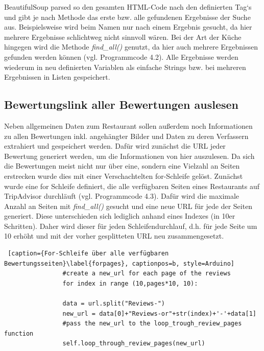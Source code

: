\documentclass[a4paper,oneside,12pt]{report}
\begin{document}
				BeautifulSoup parsed so den gesamten HTML-Code nach den definierten Tag‘s und gibt je nach Methode das erste bzw. alle gefundenen Ergebnisse der Suche aus. Beispielsweise wird beim Namen nur nach einem Ergebnis gesucht, da hier mehrere Ergebnisse schlichtweg nicht sinnvoll wären. Bei der Art der Küche hingegen wird die Methode \textit{find\_all()} genutzt, da hier auch mehrere Ergebnissen gefunden werden können (vgl. Programmcode 4.2). Alle Ergebnisse werden wiederum in neu definierten Variablen als einfache Strings bzw. bei mehreren Ergebnissen in Listen gespeichert.
	
	
			\subsection[Bewertungslink aller Bewertungen auslesen - Anja Wolf]{Bewertungslink aller Bewertungen auslesen}
			
				Neben allgemeinen Daten zum Restaurant sollen außerdem noch Informationen zu allen Bewertungen inkl. angehängter Bilder und Daten zu deren Verfassern extrahiert und gespeichert werden. Dafür wird zunächst die URL jeder Bewertung generiert werden, um die Informationen von hier auszulesen. Da sich die Bewertungen meist nicht nur über eine, sondern eine Vielzahl an Seiten erstrecken wurde dies mit einer Verschachtelten for-Schleife gelöst.
				\newline
				Zunächst wurde eine for Schleife definiert, die alle verfügbaren Seiten eines Restaurants auf TripAdvisor durchläuft (vgl. Programmcode 4.3). Dafür wird die maximale Anzahl an Seiten mit \textit{find\_all()} gesucht und eine neue URL für jede der Seiten generiert. Diese unterschieden sich lediglich anhand eines Indexes (in 10er Schritten). Daher wird dieser für jeden Schleifendurchlauf, d.h. für jede Seite um 10 erhöht und mit der vorher gesplitteten URL neu zusammengesetzt. 
				\\
				\begin{lstlisting} [caption={For-Schleife über alle verfügbaren Bewertungsseiten}\label{forpages}, captionpos=b, style=Arduino]
				#create a new_url for each page of the reviews
				for index in range (10,pages*10, 10):
				
				data = url.split("Reviews-")
				new_url = data[0]+"Reviews-or"+str(index)+'-'+data[1]
				#pass the new_url to the loop_trough_review_pages function
				self.loop_through_review_pages(new_url)
				\end{lstlisting}
				
\end{document}
